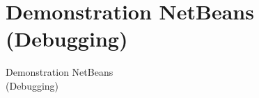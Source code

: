 \documentclass[final]{beamer}
\begin{document}
\section{Demonstration NetBeans (Debugging)}
\begin{frame}[fragile]
  \begin{center}
    \Huge{Demonstration NetBeans \\ (Debugging)}
  \end{center}
\end{frame}
\end{document}
